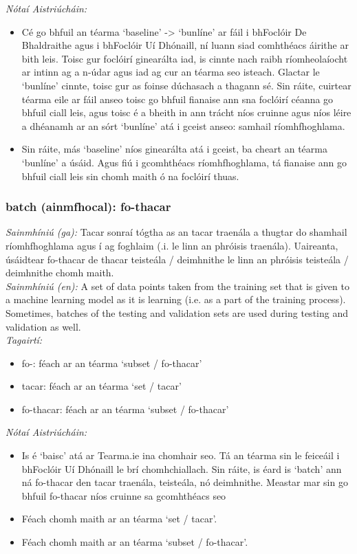  \noindent \textit{Nótaí Aistriúcháin:}
\begin{itemize}
	\item Cé go bhfuil an téarma `baseline' -> `bunlíne' ar fáil i bhFoclóir De Bhaldraithe agus i bhFoclóir Uí Dhónaill, ní luann siad comhthéacs áirithe ar bith leis. Toisc gur foclóirí ginearálta iad, is cinnte nach raibh ríomheolaíocht ar intinn ag a n-údar agus iad ag cur an téarma seo isteach. Glactar le `bunlíne' cinnte, toisc gur as foinse dúchasach a thagann sé. Sin ráite, cuirtear téarma eile ar fáil anseo toisc go bhfuil fianaise ann sna foclóirí céanna go bhfuil ciall leis, agus toisc é a bheith in ann trácht níos cruinne agus níos léire a dhéanamh ar an sórt `bunlíne' atá i gceist anseo: samhail ríomhfhoghlama.
	\item Sin ráite, más `baseline' níos ginearálta atá i gceist, ba cheart an téarma `bunlíne' a úsáid. Agus fiú i gcomhthéacs ríomhfhoghlama, tá fianaise ann go bhfuil ciall leis sin chomh maith ó na foclóirí thuas.
\end{itemize}


\subsubsection*{batch (ainmfhocal): fo-thacar}
 \noindent \textit{Sainmhíniú (ga):} Tacar sonraí tógtha as an tacar traenála a thugtar do shamhail ríomhfhoghlama agus í ag foghlaim (.i. le linn an phróisis traenála). Uaireanta, úsáidtear fo-thacar de thacar teisteála / deimhnithe le linn an phróisis teisteála / deimhnithe chomh maith.
\\
 \noindent \textit{Sainmhíniú (en):} A set of data points taken from the training set that is given to a machine learning model as it is learning (i.e. as a part of the training process). Sometimes, batches of the testing and validation sets are used during testing and validation as well.
\\
 \noindent \textit{Tagairtí:}
\begin{itemize}
	\item fo-: féach ar an téarma `subset / fo-thacar'
	\item tacar: féach ar an téarma `set / tacar'
	\item fo-thacar: féach ar an téarma `subset / fo-thacar'
\end{itemize}

 \noindent \textit{Nótaí Aistriúcháin:}
\begin{itemize}
	\item Is é `baisc' atá ar Tearma.ie ina chomhair seo. Tá an téarma sin le feiceáil i bhFoclóir Uí Dhónaill le brí chomhchiallach. Sin ráite, is éard is `batch' ann ná fo-thacar den tacar traenála, teisteála, nó deimhnithe. Meastar mar sin go bhfuil fo-thacar níos cruinne sa gcomhthéacs seo
	\item Féach chomh maith ar an téarma `set / tacar'.
	\item Féach chomh maith ar an téarma `subset / fo-thacar'.
\end{itemize}



